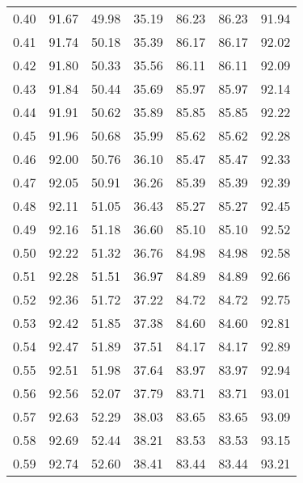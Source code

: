 \begin{tabular}{|c|c|c|c|c|c|c|}
      0.40 &     91.67 &     49.98 &      35.19 &   86.23 &      86.23 &         91.94 \\
      0.41 &     91.74 &     50.18 &      35.39 &   86.17 &      86.17 &         92.02 \\
      0.42 &     91.80 &     50.33 &      35.56 &   86.11 &      86.11 &         92.09 \\
      0.43 &     91.84 &     50.44 &      35.69 &   85.97 &      85.97 &         92.14 \\
      0.44 &     91.91 &     50.62 &      35.89 &   85.85 &      85.85 &         92.22 \\
      0.45 &     91.96 &     50.68 &      35.99 &   85.62 &      85.62 &         92.28 \\
      0.46 &     92.00 &     50.76 &      36.10 &   85.47 &      85.47 &         92.33 \\
      0.47 &     92.05 &     50.91 &      36.26 &   85.39 &      85.39 &         92.39 \\
      0.48 &     92.11 &     51.05 &      36.43 &   85.27 &      85.27 &         92.45 \\
      0.49 &     92.16 &     51.18 &      36.60 &   85.10 &      85.10 &         92.52 \\
      0.50 &     92.22 &     51.32 &      36.76 &   84.98 &      84.98 &         92.58 \\
      0.51 &     92.28 &     51.51 &      36.97 &   84.89 &      84.89 &         92.66 \\
      0.52 &     92.36 &     51.72 &      37.22 &   84.72 &      84.72 &         92.75 \\
      0.53 &     92.42 &     51.85 &      37.38 &   84.60 &      84.60 &         92.81 \\
      0.54 &     92.47 &     51.89 &      37.51 &   84.17 &      84.17 &         92.89 \\
      0.55 &     92.51 &     51.98 &      37.64 &   83.97 &      83.97 &         92.94 \\
      0.56 &     92.56 &     52.07 &      37.79 &   83.71 &      83.71 &         93.01 \\
      0.57 &     92.63 &     52.29 &      38.03 &   83.65 &      83.65 &         93.09 \\
      0.58 &     92.69 &     52.44 &      38.21 &   83.53 &      83.53 &         93.15 \\
      0.59 &     92.74 &     52.60 &      38.41 &   83.44 &      83.44 &         93.21 \\

\end{tabular}
